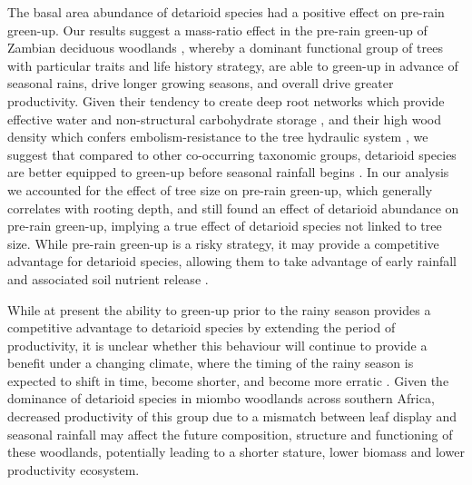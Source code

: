 \documentclass[11pt,a4paper]{article}
\begin{document}
The basal area abundance of detarioid species had a positive effect on pre-rain
green-up. Our results suggest a mass-ratio effect in the pre-rain green-up of
Zambian deciduous woodlands \citep{Grime1998}, whereby a dominant functional
group of trees with particular traits and life history strategy, are able to
green-up in advance of seasonal rains, drive longer growing seasons, and
overall drive greater productivity. Given their tendency to create deep root
networks which provide effective water and non-structural carbohydrate storage
\citep{Zhou2020, Timberlake1993}, and their high wood density which confers
embolism-resistance to the tree hydraulic system \citep{Hoffmann2011, Hacke2001, Chave2009}, we suggest
that compared to other co-occurring taxonomic groups, detarioid species are
better equipped to green-up before seasonal rainfall begins \citep{Vinya2018}.
In our analysis we accounted for the effect of tree size on pre-rain green-up,
which generally correlates with rooting depth, and still found an effect of
detarioid abundance on pre-rain green-up, implying a true effect of detarioid
species not linked to tree size. While pre-rain green-up is a risky strategy,
it may provide a competitive advantage for detarioid species, allowing them to
take advantage of early rainfall and associated soil nutrient release
\citep{February2016}.

While at present the ability to green-up prior to the rainy season provides a
competitive advantage to detarioid species by extending the period of
productivity, it is unclear whether this behaviour will continue to provide a
benefit under a changing climate, where the timing of the rainy season is
expected to shift in time, become shorter, and become more erratic
\citep{Shongwe2011, Pohl2017, Wainwright2021}. Given the dominance of detarioid
species in miombo woodlands across southern Africa, decreased productivity of
this group due to a mismatch between leaf display and seasonal rainfall may
affect the future composition, structure and functioning of these woodlands,
potentially leading to a shorter stature, lower biomass and lower productivity
ecosystem.
\end{document}
